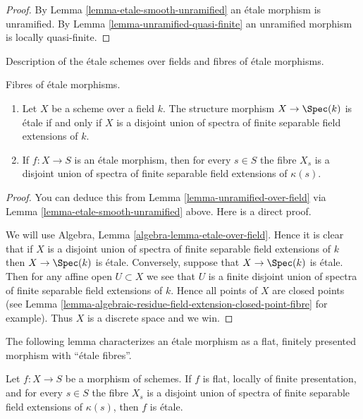 \begin{proof}
By
Lemma \ref{lemma-etale-smooth-unramified}
an \'etale morphism is unramified. By
Lemma \ref{lemma-unramified-quasi-finite}
an unramified morphism is locally quasi-finite.
\end{proof}

\begin{lemma}
\label{lemma-etale-over-field}
\begin{slogan}
Description of the \'etale schemes over fields and fibres
of \'etale morphisms.
\end{slogan}
Fibres of \'etale morphisms.
\begin{enumerate}
\item Let $X$ be a scheme over a field $k$.
The structure morphism $X \to \Spec(k)$ is \'etale if
and only if $X$ is a disjoint union of spectra of finite separable
field extensions of $k$.
\item If $f : X \to S$ is an \'etale morphism, then for every $s \in S$ the
fibre $X_s$ is a disjoint union of spectra of finite separable field
extensions of $\kappa(s)$.
\end{enumerate}
\end{lemma}

\begin{proof}
You can deduce this from Lemma \ref{lemma-unramified-over-field}
via Lemma \ref{lemma-etale-smooth-unramified} above.
Here is a direct proof.

\medskip\noindent
We will use Algebra, Lemma \ref{algebra-lemma-etale-over-field}.
Hence it is clear that if $X$ is a disjoint union of spectra of finite
separable field extensions of $k$ then $X \to \Spec(k)$ is \'etale.
Conversely, suppose that $X \to \Spec(k)$ is \'etale. Then for any affine
open $U \subset X$ we see that $U$ is a finite disjoint union of spectra
of finite separable field extensions of $k$. Hence all points of $X$
are closed points (see
Lemma \ref{lemma-algebraic-residue-field-extension-closed-point-fibre}
for example). Thus $X$ is a discrete space and we win.
\end{proof}

\noindent
The following lemma characterizes an \'etale morphism as a
flat, finitely presented morphism with ``\'etale fibres''.

\begin{lemma}
\label{lemma-etale-flat-etale-fibres}
Let $f : X \to S$ be a morphism of schemes.
If $f$ is flat, locally of finite presentation, and for every $s \in S$
the fibre $X_s$ is a disjoint union of spectra of finite separable
field extensions of $\kappa(s)$, then $f$ is \'etale.
\end{lemma}

